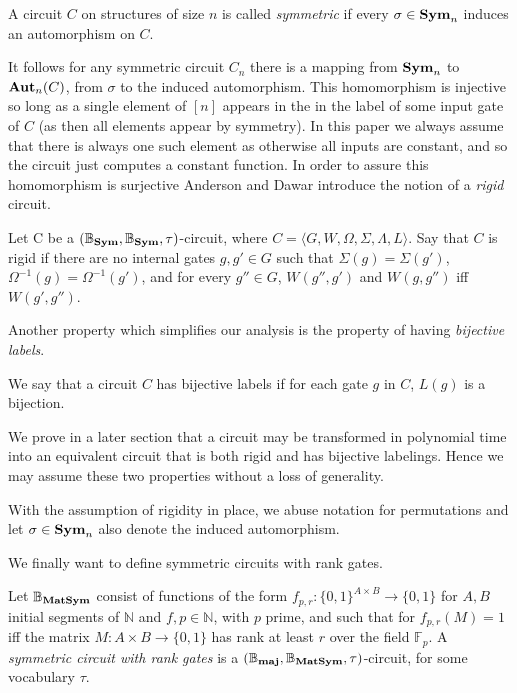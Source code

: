 \documentclass[12pt]{report}
\newcommand{\aut}{\text{\textbf{Aut}}}
\newcommand{\sym}{\text{\textbf{Sym}}}
\newcommand{\maj}{\text{\textbf{maj}}}
\newcommand{\matsym}{\text{\textbf{MatSym}}}
\begin{document}
\begin{definition}
  A circuit $C$ on structures of size $n$ is called \emph{symmetric} if every
  $\sigma \in \sym_n$ induces an automorphism on $C$.
\end{definition}

It follows for any symmetric circuit $C_n$ there is a mapping from $\sym_n$ to
$\aut_n(C)$, from $ \sigma$ to the induced automorphism. This homomorphism is
injective so long as a single element of $[n]$ appears in the in the label of
some input gate of $C$ (as then all elements appear by
symmetry)\cite{AndersonD17}. In this paper we always assume that there is always
one such element as otherwise all inputs are constant, and so the circuit just
computes a constant function. In order to assure this homomorphism is surjective
Anderson and Dawar \cite{AndersonD17} introduce the notion of a \emph{rigid}
circuit.

\begin{definition}[Rigidity]
  Let C be a $(\mathbb{B}_\sym, \mathbb{B}_\sym, \tau)$-circuit, where $C =
  \langle G, W, \Omega, \Sigma, \Lambda, L\rangle$. Say that $C$ is rigid if
  there are no internal gates $g, g' \in G$ such that $\Sigma(g) = \Sigma (g')$,
  $\Omega^{-1}(g) = \Omega^{-1}(g')$, and for every $g'' \in G$, $W(g'', g')$
  and $W(g,g'')$ iff $W(g', g'')$.
\end{definition}

Another property which simplifies our analysis is the property of having
\emph{bijective labels}.

\begin{definition}
  We say that a circuit $C$ has bijective labels if for each gate $g$ in $C$,
  $L(g)$ is a bijection.
\end{definition}

We prove in a later section that a circuit may be transformed in polynomial time
into an equivalent circuit that is both rigid and has bijective labelings. Hence
we may assume these two properties without a loss of generality.

With the assumption of rigidity in place, we abuse notation for permutations and
let $\sigma \in \sym_n$ also denote the induced automorphism.

We finally want to define symmetric circuits with rank gates.

\begin{definition}
  Let $\mathbb{B}_{\matsym}$ consist of functions of the form $f_{p,r}:
  \{0,1\}^{A \times B} \rightarrow \{0,1\}$ for $A, B$ initial segments of
  $\mathbb{N}$ and $f, p \in \mathbb{N}$, with $p$ prime, and such that for
  $f_{p,r}(M) = 1$ iff the matrix $M: A \times B \rightarrow \{0,1\}$ has rank
  at least $r$ over the field $\mathbb{F}_p$. A \emph{symmetric circuit with
    rank gates} is a $(\mathbb{B}_\maj, \mathbb{B}_\matsym, \tau)$-circuit, for some
  vocabulary $\tau$.
\end{definition}
\end{document}
